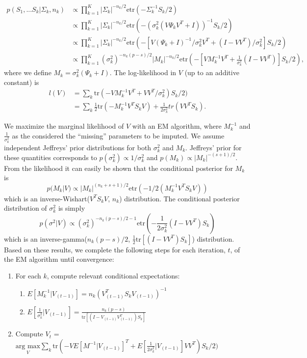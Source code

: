 \documentclass[12pt]{article}
\newcommand{\tr}{\text{tr}}
\newcommand{\etr}{\text{etr}}
\begin{document}
\begin{align}
\nonumber p(S_1, ... S_k | \Sigma_k,n_k) &\propto \prod_{k=1}^K |\Sigma_k|^{-n_k/2}\etr(-\Sigma_k^{-1}S_k/2)  \\
\nonumber &\propto \prod_{k=1}^K  |\Sigma_k|^{-n_k/2}\etr(-(\sigma_k^2(V\Psi_kV^T +
  I))^{-1}S_k/2) \\
\nonumber &\propto \prod_{k=1}^K  |\Sigma_k|^{-n_k/2}\etr(-\left[V(\Psi_k +
  I)^{-1}/\sigma_k^2 V^T + (I-VV^T)/\sigma^2_k\right]S_k/2)
  \\
&\propto \prod_{k=1}^K  (\sigma_k^2)^{-n_k(p-s)/2}|M_k|^{-n_k/2}\etr(-\left[VM_k^{-1}V^T + \frac{1}{\sigma^2_k} (I-VV^T)\right]S_k/2) ,
\end{align}
%
\noindent where we define $M_k = \sigma_k^2(\Psi_k + I)$.  The log-likelihood in
$V$ (up to an additive constant) is
%
\begin{align}
\nonumber l(V) &= \sum_k \tr\left(-VM_k^{-1}V^T +
       VV^T/\sigma^2_k\right)S_k/2)\\
&= \sum_k \frac{1}{2}\tr\left(-M_k^{-1}V^T S_kV\right) + \frac{1}{2\sigma_k^2}tr\left(VV^T S_k\right).
\end{align}


We maximize the marginal likelihood of $V$ with an EM algorithm, where
$M_k^{-1}$ and $\frac{1}{\sigma_k^2}$ as the considered the
``missing'' parameters to be imputed.  We assume independent Jeffreys'
prior distributions for both $\sigma_k^2$ and $M_k$.  Jeffreys' prior
for these quantities corresponds to
$p(\sigma_k^2) \propto 1/\sigma_k^2$ and
$p(M_k) \propto |M_k|^{-(s+1)/2}$.  From the likelihood it can easily
be shown that the conditional posterior for $M_k$ is
%
$$p(M_k | V) \propto |M_k|^{(n_k + s + 1)/2}\etr(-1/2(M_k^{-1}V^TS_kV)) $$
%
\noindent which is an inverse-Wishart($V^TS_kV$, $n_k$) distribution.  The
conditional posterior distribution of $\sigma_k^2$ is simply
%
$$p\left(\sigma^2 | V\right) \propto (\sigma_k^2)^{-n_k(p-s)/2-1}\etr\left(-\frac{1}{2\sigma^2_k} (I-VV^T)S_k\right)  $$
%
\noindent which is an inverse-gamma($n_k(p-s)/2$,
$\frac{1}{2}\text{tr}[(I-VV^T)S_k]$) distribution.  Based on these
results, we complete the following steps for each iteration, $t$, of
the EM algorithm until convergence:

\begin{enumerate}
\item For each $k$, compute relevant conditional expectations:
\begin{enumerate}
\item $E[M_k^{-1} | V_{(t-1)}] = n_k(V_{(t-1)}^T S_kV_{(t-1)})^{-1}$
\item $E[\frac{1}{\sigma_k^2}|V_{(t-1)}] = \frac{n_k(p-s)}{\text{tr}[(I-V_{(t-1)}V_{(t-1)}^T)S_k]}$
\end{enumerate}
\item Compute $V_{t}$ = $\underset{V}{\text{arg } \text{max}}  \sum_k \text{tr}\left(-VE[M^{-1}|V_{(t-1)}]^T +
       E[\frac{1}{2\sigma_k^2}|V_{(t-1)}]VV^T\right)S_k/2)$ 
\end{enumerate}
\end{document}
